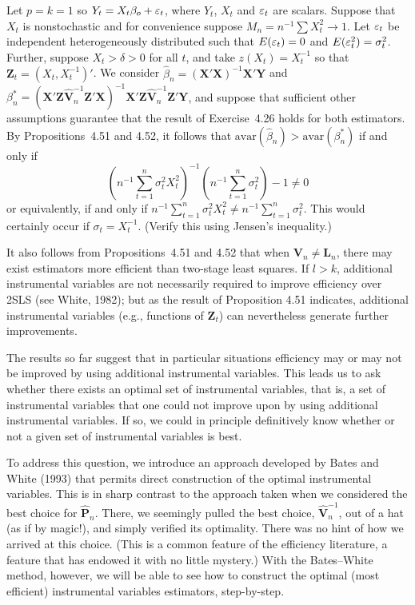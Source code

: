 \begin{example}\label{ex:4.53}
Let $p = k = 1$ so $Y_t = X_t\beta_o + \varepsilon_t$, where $Y_t$, $X_t$ and $\varepsilon_t$
are scalars. Suppose that $X_t$ is nonstochastic and for convenience suppose
$M_n = n^{-1}\sum X_t^2 \to 1$. Let $\varepsilon_t$ be independent heterogeneously distributed
such that $E(\varepsilon_t) = 0$ and $E(\varepsilon_t^2) = \sigma_t^2$. Further, suppose $X_t > \delta > 0$
for all $t$, and take $z(X_t) = X_t^{-1}$ so that $\mathbf{Z}_t = (X_t, X_t^{-1})'$. We consider
$\hat{\beta}_n = (\mathbf{X}'\mathbf{X})^{-1}\mathbf{X}'\mathbf{Y}$ and $\beta_n^* = (\mathbf{X}'\mathbf{Z}\hat{\mathbf{V}}_n^{-1}\mathbf{Z}'\mathbf{X})^{-1}\mathbf{X}'\mathbf{Z}\hat{\mathbf{V}}_n^{-1}\mathbf{Z}'\mathbf{Y}$, and suppose
that sufficient other assumptions guarantee that the result of Exercise~4.26
holds for both estimators. By Propositions~4.51 and 4.52, it follows that
$\mathrm{avar}(\hat{\beta}_n) > \mathrm{avar}(\beta_n^*)$ if and only if
\[
\left(n^{-1}\sum_{t=1}^{n}\sigma_t^2 X_t^2\right)^{-1}\left(n^{-1}\sum_{t=1}^{n}\sigma_t^2\right) - 1 \neq 0
\]
or equivalently, if and only if $n^{-1}\sum_{t=1}^{n}\sigma_t^2 X_t^2 \neq n^{-1}\sum_{t=1}^{n}\sigma_t^2$. This would
certainly occur if $\sigma_t = X_t^{-1}$. (Verify this using Jensen's inequality.)
\end{example}

It also follows from Propositions~4.51 and 4.52 that when $\mathbf{V}_n \neq \mathbf{L}_n$, there
may exist estimators more efficient than two-stage least squares. If $l > k$,
additional instrumental variables are not necessarily required to improve
efficiency over 2SLS (see White, 1982); but as the result of Proposition
4.51 indicates, additional instrumental variables (e.g., functions of $\mathbf{Z}_t$) can
nevertheless generate further improvements.

The results so far suggest that in particular situations efficiency may or
may not be improved by using additional instrumental variables. This leads
us to ask whether there exists an optimal set of instrumental variables, that
is, a set of instrumental variables that one could not improve upon by using
additional instrumental variables. If so, we could in principle definitively
know whether or not a given set of instrumental variables is best.

To address this question, we introduce an approach developed by Bates
and White (1993) that permits direct construction of the optimal instrumental variables. This is in sharp contrast to the approach taken when
we considered the best choice for $\hat{\mathbf{P}}_n$. There, we seemingly pulled the best
choice, $\hat{\mathbf{V}}_n^{-1}$, out of a hat (as if by magic!), and simply verified its optimality. There was no hint of how we arrived at this choice. (This is a common
feature of the efficiency literature, a feature that has endowed it with no
little mystery.) With the Bates--White method, however, we will be able
to see how to construct the optimal (most efficient) instrumental variables
estimators, step-by-step.

